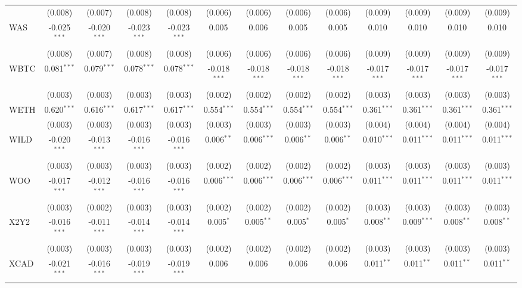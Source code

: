 \begin{table}[!htbp]
\begin{tabular}{@{\extracolsep{5pt}}lcccccccccccc}
  & (0.008) & (0.007) & (0.008) & (0.008) & (0.006) & (0.006) & (0.006) & (0.006) & (0.009) & (0.009) & (0.009) & (0.009) \\
 WAS & -0.025$^{***}$ & -0.020$^{***}$ & -0.023$^{***}$ & -0.023$^{***}$ & 0.005$^{}$ & 0.006$^{}$ & 0.005$^{}$ & 0.005$^{}$ & 0.010$^{}$ & 0.010$^{}$ & 0.010$^{}$ & 0.010$^{}$ \\
  & (0.008) & (0.007) & (0.008) & (0.008) & (0.006) & (0.006) & (0.006) & (0.006) & (0.009) & (0.009) & (0.009) & (0.009) \\
 WBTC & 0.081$^{***}$ & 0.079$^{***}$ & 0.078$^{***}$ & 0.078$^{***}$ & -0.018$^{***}$ & -0.018$^{***}$ & -0.018$^{***}$ & -0.018$^{***}$ & -0.017$^{***}$ & -0.017$^{***}$ & -0.017$^{***}$ & -0.017$^{***}$ \\
  & (0.003) & (0.003) & (0.003) & (0.003) & (0.002) & (0.002) & (0.002) & (0.002) & (0.003) & (0.003) & (0.003) & (0.003) \\
 WETH & 0.620$^{***}$ & 0.616$^{***}$ & 0.617$^{***}$ & 0.617$^{***}$ & 0.554$^{***}$ & 0.554$^{***}$ & 0.554$^{***}$ & 0.554$^{***}$ & 0.361$^{***}$ & 0.361$^{***}$ & 0.361$^{***}$ & 0.361$^{***}$ \\
  & (0.003) & (0.003) & (0.003) & (0.003) & (0.003) & (0.003) & (0.003) & (0.003) & (0.004) & (0.004) & (0.004) & (0.004) \\
 WILD & -0.020$^{***}$ & -0.013$^{***}$ & -0.016$^{***}$ & -0.016$^{***}$ & 0.006$^{**}$ & 0.006$^{***}$ & 0.006$^{**}$ & 0.006$^{**}$ & 0.010$^{***}$ & 0.011$^{***}$ & 0.011$^{***}$ & 0.011$^{***}$ \\
  & (0.003) & (0.003) & (0.003) & (0.003) & (0.002) & (0.002) & (0.002) & (0.002) & (0.003) & (0.003) & (0.003) & (0.003) \\
 WOO & -0.017$^{***}$ & -0.012$^{***}$ & -0.016$^{***}$ & -0.016$^{***}$ & 0.006$^{***}$ & 0.006$^{***}$ & 0.006$^{***}$ & 0.006$^{***}$ & 0.011$^{***}$ & 0.011$^{***}$ & 0.011$^{***}$ & 0.011$^{***}$ \\
  & (0.003) & (0.002) & (0.003) & (0.003) & (0.002) & (0.002) & (0.002) & (0.002) & (0.003) & (0.003) & (0.003) & (0.003) \\
 X2Y2 & -0.016$^{***}$ & -0.011$^{***}$ & -0.014$^{***}$ & -0.014$^{***}$ & 0.005$^{*}$ & 0.005$^{**}$ & 0.005$^{*}$ & 0.005$^{*}$ & 0.008$^{**}$ & 0.009$^{***}$ & 0.008$^{**}$ & 0.008$^{**}$ \\
  & (0.003) & (0.003) & (0.003) & (0.003) & (0.002) & (0.002) & (0.002) & (0.002) & (0.003) & (0.003) & (0.003) & (0.003) \\
 XCAD & -0.021$^{***}$ & -0.016$^{***}$ & -0.019$^{***}$ & -0.019$^{***}$ & 0.006$^{}$ & 0.006$^{}$ & 0.006$^{}$ & 0.006$^{}$ & 0.011$^{**}$ & 0.011$^{**}$ & 0.011$^{**}$ & 0.011$^{**}$ \\

\end{tabular}
\end{table}
